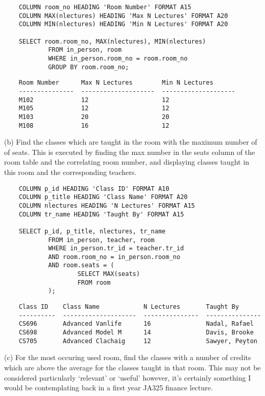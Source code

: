 \documentclass[11pt, english]{article}
\begin{document}
	{\scriptsize\begin{verbatim}
	COLUMN room_no HEADING 'Room Number' FORMAT A15
	COLUMN MAX(nlectures) HEADING 'Max N Lectures' FORMAT A20
	COLUMN MIN(nlectures) HEADING 'Min N Lectures' FORMAT A20

	SELECT room.room_no, MAX(nlectures), MIN(nlectures)
        	FROM in_person, room
        	WHERE in_person.room_no = room.room_no
        	GROUP BY room.room_no;
	\end{verbatim}}

	{\scriptsize\begin{verbatim}
	Room Number      Max N Lectures        Min N Lectures
	---------------  --------------------  --------------------
	M102             12                    12
	M105             12                    12
	M103             20                    20
	M108             16                    12
	\end{verbatim}}

	(b) Find the classes which are taught in the room with the maximum number of of seats. This is executed by finding the max number in the seats column of the room table and the correlating room number, and displaying classes taught in this room and the corresponding teachers.

	{\scriptsize\begin{verbatim}
	COLUMN p_id HEADING 'Class ID' FORMAT A10
	COLUMN p_title HEADING 'Class Name' FORMAT A20
	COLUMN nlectures HEADING 'N Lectures' FORMAT A15
	COLUMN tr_name HEADING 'Taught By' FORMAT A15

	SELECT p_id, p_title, nlectures, tr_name
        	FROM in_person, teacher, room
        	WHERE in_person.tr_id = teacher.tr_id
        	AND room.room_no = in_person.room_no
        	AND room.seats = (
                	SELECT MAX(seats)
                	FROM room
        	);
	\end{verbatim}}

	{\scriptsize\begin{verbatim}
	Class ID    Class Name            N Lectures       Taught By
	----------  --------------------  ---------------  ---------------
	CS696       Advanced Vanlife      16               Nadal, Rafael
	CS698       Advanced Model M      14               Davis, Brooke
	CS705       Advanced Clachaig     12               Sawyer, Peyton
	\end{verbatim}}
	
	(c) For the most occuring used room, find the classes with a number of credits which are above the average for the classes taught in that room. This may not be considered particularly `relevant' or `useful' however, it's certainly something I would be contemplating back in a first year JA325 finance lecture.
\end{document}
